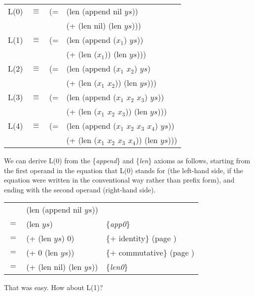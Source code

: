 \begin{center}
\begin{tabular}{llll}
L(0) & $\equiv$ & (= &(len (append nil $ys$)) \\
     &          &    &(+ (len nil) (len $ys$))) \\
L(1) & $\equiv$ & (= &(len (append ($x_1$) $ys$)) \\
     &          &    &(+ (len ($x_1$)) (len $ys$))) \\
L(2) & $\equiv$ & (= &(len (append ($x_1$ $x_2$) $ys$) 	\\
	 &          &    &(+ (len ($x_1$ $x_2$)) (len $ys$))) \\
L(3) & $\equiv$ & (= &(len (append ($x_1$ $x_2$ $x_3$) $ys$)) \\
     &          &    &(+ (len ($x_1$ $x_2$ $x_3$)) (len $ys$))) \\
L(4) & $\equiv$ & (= &(len (append ($x_1$ $x_2$ $x_3$ $x_4$) $ys$)) \\
     &          &    &(+ (len ($x_1$ $x_2$ $x_3$ $x_4$)) (len $ys$)))
\end{tabular}
\end{center}

We can derive L(0) from the \{\emph{append}\} and \{\emph{len}\} axioms as follows, starting from the first operand in the equation that L(0) stands for (the left-hand side, if the equation were written in the conventional way rather than prefix form), and ending with the second operand (right-hand side).

\begin{center}
\begin{tabular}{lll}
    & (len (append nil $ys$))  &                                                \\
$=$ & (len $ys$)               & \{\emph{app0}\}                                \\
$=$ & (+ (len $ys$) 0)         & \{$+$ identity\}    (page \pageref{fig-02-01}) \\
$=$ & (+ 0 (len $ys$))         & \{$+$ commutative\} (page \pageref{fig-02-01}) \\
$=$ & (+ (len nil) (len $ys$)) & \{\emph{len0}\} \\
\end{tabular}
\end{center}

That was easy. How about L(1)?

